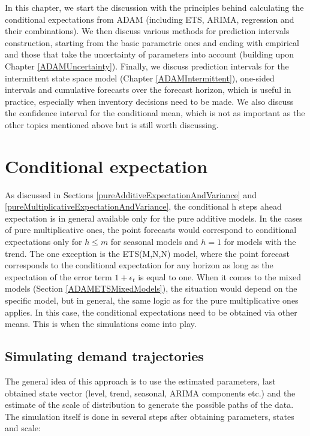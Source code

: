 \documentclass[
]{book}
\theoremstyle{definition}
\theoremstyle{definition}
\theoremstyle{definition}
\theoremstyle{definition}
\theoremstyle{remark}
\begin{document}
In this chapter, we start the discussion with the principles behind calculating the conditional expectations from ADAM (including ETS, ARIMA, regression and their combinations). We then discuss various methods for prediction intervals construction, starting from the basic parametric ones and ending with empirical and those that take the uncertainty of parameters into account (building upon Chapter \ref{ADAMUncertainty}). Finally, we discuss prediction intervals for the intermittent state space model (Chapter \ref{ADAMIntermittent}), one-sided intervals and cumulative forecasts over the forecast horizon, which is useful in practice, especially when inventory decisions need to be made. We also discuss the confidence interval for the conditional mean, which is not as important as the other topics mentioned above but is still worth discussing.

\hypertarget{ADAMForecastingExpectation}{%
\section{Conditional expectation}\label{ADAMForecastingExpectation}}

As discussed in Sections \ref{pureAdditiveExpectationAndVariance} and \ref{pureMultiplicativeExpectationAndVariance}, the conditional h steps ahead expectation is in general available only for the pure additive models. In the cases of pure multiplicative ones, the point forecasts would correspond to conditional expectations only for \(h \leq m\) for seasonal models and \(h=1\) for models with the trend. The one exception is the ETS(M,N,N) model, where the point forecast corresponds to the conditional expectation for any horizon as long as the expectation of the error term \(1+\epsilon_t\) is equal to one. When it comes to the mixed models (Section \ref{ADAMETSMixedModels}), the situation would depend on the specific model, but in general, the same logic as for the pure multiplicative ones applies. In this case, the conditional expectations need to be obtained via other means. This is when the simulations come into play.

\hypertarget{ADAMForecastingExpectationSimulations}{%
\subsection{Simulating demand trajectories}\label{ADAMForecastingExpectationSimulations}}

The general idea of this approach is to use the estimated parameters, last obtained state vector (level, trend, seasonal, ARIMA components etc.) and the estimate of the scale of distribution to generate the possible paths of the data. The simulation itself is done in several steps after obtaining parameters, states and scale:
\end{document}
